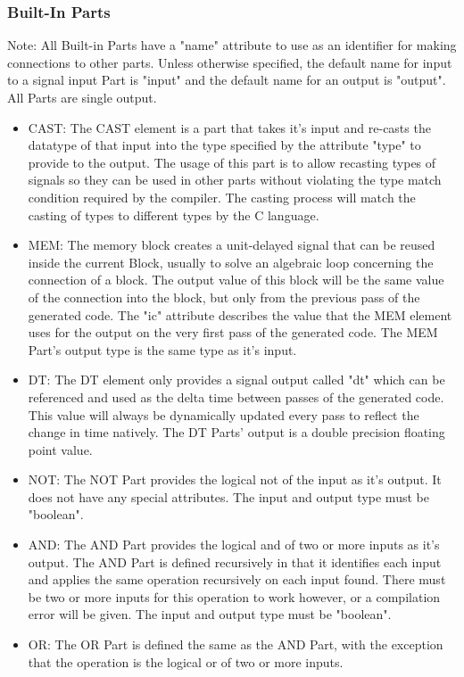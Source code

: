 \subsubsection{Built-In Parts}
Note: All Built-in Parts have a "name" attribute to use as an identifier for making connections to other parts. Unless otherwise specified, the default name for input to a signal input Part is "input" and the default name for an output is "output". All Parts are single output.
\begin{itemize}[label={}]
    \item CAST:
The CAST element is a part that takes it's input and re-casts the datatype of that input into the type specified by the attribute "type" to provide to the output.
The usage of this part is to allow recasting types of signals so they can be used in other parts without violating the type match condition required by the compiler.
The casting process will match the casting of types to different types by the C language.
    \item MEM:
The memory block creates a unit-delayed signal that can be reused inside the current Block, usually to solve an algebraic loop concerning the connection of a block.
The output value of this block will be the same value of the connection into the block, but only from the previous pass of the generated code.
The "ic" attribute describes the value that the MEM element uses for the output on the very first pass of the generated code.
The MEM Part's output type is the same type as it's input.
    \item DT:
The DT element only provides a signal output called "dt" which can be referenced and used as the delta time between passes of the generated code.
This value will always be dynamically updated every pass to reflect the change in time natively.
The DT Parts' output is a double precision floating point value.
    \item NOT:
The NOT Part provides the logical not of the input as it's output.
It does not have any special attributes.
The input and output type must be "boolean".
    \item AND:
The AND Part provides the logical and of two or more inputs as it's output.
The AND Part is defined recursively in that it identifies each input and applies the same operation recursively on each input found.
There must be two or more inputs for this operation to work however, or a compilation error will be given.
The input and output type must be "boolean".
    \item OR:
The OR Part is defined the same as the AND Part, with the exception that the operation is the logical or of two or more inputs.

\end{itemize}
